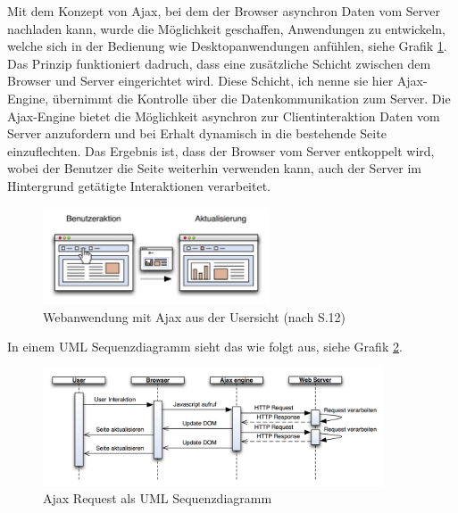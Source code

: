  
  Mit dem Konzept von \ac{Ajax}, bei dem der Browser asynchron Daten vom Server
  nachladen kann, wurde die Möglichkeit geschaffen, Anwendungen zu entwickeln,
  welche sich in der Bedienung wie Desktopanwendungen anfühlen, siehe Grafik
  \ref{img:ajaxPageReload}. Das Prinzip funktioniert dadruch, dass eine
  zusätzliche Schicht zwischen dem Browser und Server eingerichtet wird. Diese
  Schicht, ich nenne sie hier Ajax-Engine, übernimmt die Kontrolle über die
  Datenkommunikation zum Server. Die Ajax-Engine bietet die Möglichkeit
  asynchron zur Clientinteraktion Daten vom Server anzufordern und bei Erhalt
  dynamisch in die bestehende Seite einzuflechten. Das Ergebnis ist, dass der
  Browser vom Server entkoppelt wird, wobei der Benutzer die Seite weiterhin
  verwenden kann, auch der Server im Hintergrund getätigte Interaktionen
  verarbeitet.
  
  \begin{figure}[hbt]
    \begin{center}
      \includegraphics[width=0.6\textwidth]{./image/ajaxPageReload.png}
      \caption{Webanwendung mit Ajax aus der Usersicht (nach
      \cite{DiplomarbeitStephanSchuster} S.12)}
      \label{img:ajaxPageReload}
    \end{center}
  \end{figure}
  
  In einem \ac{UML} Sequenzdiagramm sieht das wie folgt aus, siehe Grafik
  \ref{img:sequenzdiagrammAjaxPageReload}.
  
  \begin{figure}[hbt]
    \begin{center}
      \includegraphics[width=0.9\textwidth]{./image/sequenzdiagrammAjaxPageReload.png}
      \caption{Ajax Request als \ac{UML} Sequenzdiagramm}
      \label{img:sequenzdiagrammAjaxPageReload}
    \end{center}
  \end{figure}
  
